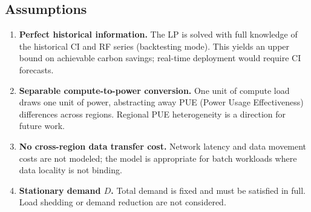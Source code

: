 \subsection{Assumptions}

\begin{enumerate}[leftmargin=1.5em]
  \item \textbf{Perfect historical information.}
        The LP is solved with full knowledge of the historical CI and RF series (backtesting mode).
        This yields an upper bound on achievable carbon savings; real-time deployment would require CI forecasts.
  \item \textbf{Separable compute-to-power conversion.}
        One unit of compute load draws one unit of power, abstracting away PUE (Power Usage Effectiveness) differences across regions.
        Regional PUE heterogeneity is a direction for future work.
  \item \textbf{No cross-region data transfer cost.}
        Network latency and data movement costs are not modeled; the model is appropriate for batch workloads where data locality is not binding.
  \item \textbf{Stationary demand $D$.}
        Total demand is fixed and must be satisfied in full.
        Load shedding or demand reduction are not considered.
\end{enumerate}
